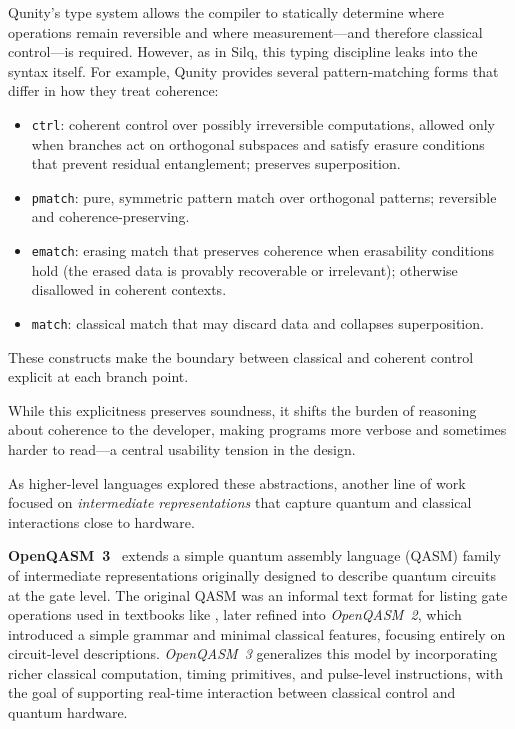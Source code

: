 Qunity’s type system allows the compiler to statically determine where operations remain reversible and where measurement—and therefore classical control—is required.  
However, as in Silq, this typing discipline leaks into the syntax itself.  For example, Qunity provides several pattern-matching forms that differ in how they treat coherence:
\begin{itemize}
  \item \texttt{ctrl}: coherent control over possibly irreversible computations, allowed only when branches act on orthogonal subspaces and satisfy erasure conditions that prevent residual entanglement; preserves superposition.
  \item \texttt{pmatch}: pure, symmetric pattern match over orthogonal patterns; reversible and coherence-preserving.
  \item \texttt{ematch}: erasing match that preserves coherence when erasability conditions hold (the erased data is provably recoverable or irrelevant); otherwise disallowed in coherent contexts.
  \item \texttt{match}: classical match that may discard data and collapses superposition.
\end{itemize}
These constructs make the boundary between classical and coherent control explicit at each branch point.

While this explicitness preserves soundness, it shifts the burden of reasoning about coherence to the developer, making programs more verbose and sometimes harder to read—a central usability tension in the design.

\vspace{2em}

As higher-level languages explored these abstractions, another line of work focused on \emph{intermediate representations} that capture quantum and classical interactions close to hardware. 

\textbf{OpenQASM~3}~\cite{openqasm3} extends a simple quantum assembly language (QASM) family of intermediate representations originally designed to describe quantum circuits at the gate level.  
The original QASM was an informal text format for listing gate operations used in textbooks like \cite{nielsen&chuang}, later refined into \emph{OpenQASM~2}\cite{openqasm2}, which introduced a simple grammar and minimal classical features, focusing entirely on circuit-level descriptions.  
\emph{OpenQASM~3} generalizes this model by incorporating richer classical computation, timing primitives, and pulse-level instructions, with the goal of supporting real-time interaction between classical control and quantum hardware.


